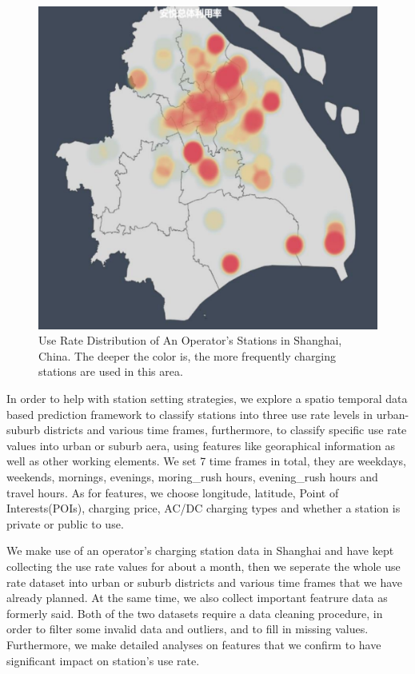\begin{figure}[!htp]
	\includegraphics[width=\columnwidth]{./figures/rate.pdf}
	\centering
	\caption{Use Rate Distribution of An Operator's Stations in Shanghai, China. The deeper the color is, the more frequently charging stations are used in this area.}
	\label{fig1}
\end{figure}  

In order to help with station setting strategies, we explore a spatio temporal data based prediction framework to classify stations into three use rate levels in urban-suburb districts and various time frames, furthermore, to classify specific use rate values into urban or suburb aera, using features like georaphical information as well as other working elements. We set 7 time frames in total, they are weekdays, weekends, mornings, evenings, moring\_rush hours, evening\_rush hours and travel hours. As for features, we choose longitude, latitude, Point of Interests(POIs), charging price, AC/DC charging types and whether a station is private or public to use.

We make use of an operator's charging station data in Shanghai and  have kept collecting the use rate values for about a month, then we seperate the whole use rate dataset into urban or suburb districts and various time frames that we have already planned. At the same time, we also collect important featrure data as formerly said. Both of the two datasets require a data cleaning procedure, in order to filter some invalid data and outliers, and to fill in missing values. Furthermore, we make detailed analyses on features that we confirm to have significant impact on station's use rate.

